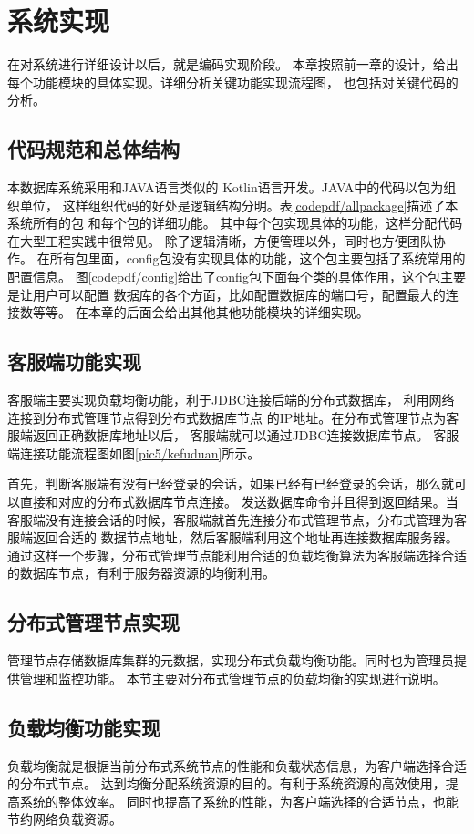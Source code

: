 
\chapter{系统实现}
在对系统进行详细设计以后，就是编码实现阶段。
本章按照前一章的设计，给出每个功能模块的具体实现。详细分析关键功能实现流程图，
也包括对关键代码的分析。
\section{代码规范和总体结构}
本数据库系统采用和JAVA语言类似的
Kotlin语言开发。JAVA中的代码以包为组织单位，
这样组织代码的好处是逻辑结构分明。表\ref{codepdf/allpackage}描述了本系统所有的包
和每个包的详细功能。
其中每个包实现具体的功能，这样分配代码在大型工程实践中很常见。
除了逻辑清晰，方便管理以外，同时也方便团队协作。
在所有包里面，config包没有实现具体的功能，这个包主要包括了系统常用的配置信息。
图\ref{codepdf/config}给出了config包下面每个类的具体作用，这个包主要是让用户可以配置
数据库的各个方面，比如配置数据库的端口号，配置最大的连接数等等。
在本章的后面会给出其他其他功能模块的详细实现。
\section{客服端功能实现}
客服端主要实现负载均衡功能，利于JDBC连接后端的分布式数据库，
利用网络连接到分布式管理节点得到分布式数据库节点
的IP地址。在分布式管理节点为客服端返回正确数据库地址以后，
客服端就可以通过JDBC连接数据库节点。
客服端连接功能流程图如图\ref{pic5/kefuduan}所示。

首先，判断客服端有没有已经登录的会话，如果已经有已经登录的会话，那么就可以直接和对应的分布式数据库节点连接。
发送数据库命令并且得到返回结果。当客服端没有连接会话的时候，客服端就首先连接分布式管理节点，分布式管理为客服端返回合适的
数据节点地址，然后客服端利用这个地址再连接数据库服务器。
通过这样一个步骤，分布式管理节点能利用合适的负载均衡算法为客服端选择合适的数据库节点，有利于服务器资源的均衡利用。
\section{分布式管理节点实现}
管理节点存储数据库集群的元数据，实现分布式负载均衡功能。同时也为管理员提供管理和监控功能。
本节主要对分布式管理节点的负载均衡的实现进行说明。
\section{负载均衡功能实现}
负载均衡就是根据当前分布式系统节点的性能和负载状态信息，为客户端选择合适的分布式节点。
达到均衡分配系统资源的目的。有利于系统资源的高效使用，提高系统的整体效率。
同时也提高了系统的性能，为客户端选择的合适节点，也能节约网络负载资源。


